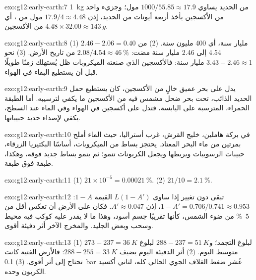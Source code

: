 \begin{solution}{exo:g12:early-earth:7}
\qty{1}{kg} من الحديد يساوي $1000/55.85 \approx 17.9$ مول؛ وجزيء واحد من
الأكسجين يأخذ أربعة أيونات من الحديد، إذن $17.9/4 \approx 4.48$ مول من
، أي $4.48 \times 32.00 \approx \qty{143}{g}$ من الأكسجين.
\end{solution}

\begin{solution}{exo:g12:early-earth:8}
(1) $2.46 - 2.06 = 0.40$ مليار سنة، أي 400 مليون سنة. (2) من 4.54
إلى 2.46 مليار سنة مضت: $2.08/4.54 \approx \qty{46}{\percent}$ من
تاريخ الأرض. (3) نحو $3.43 - 2.46 \approx 1$ مليار سنة: فالأكسجين
الذي صنعته الميكروبات ظل يُستهلك زمنًا طويلًا قبل أن يستطيع البقاء في
الهواء.
\end{solution}

\begin{solution}{exo:g12:early-earth:9}
 يدل على بحر عميق خالٍ من الأكسجين، كان يستطيع حمل
الحديد الذائب، تحت بحر ضحل مشمس فيه من الأكسجين ما يكفي لترسيبه.
أما الطبقة الحمراء، المترسبة على اليابسة، فتدل على أكسجين في الهواء وفي الماء
عند السطح، يكفي لإصداء حديد حبيباتها.
\end{solution}

\begin{solution}{exo:g12:early-earth:10}
في بركة هاملين، خليج القرش، غرب أستراليا، حيث الماء أملح بمرتين
من ماء البحر المعتاد. يحتجز بساط من الميكروبات، أساسًا البكتيريا الزرقاء،
حبيبات الرسوبيات ويربطها ويجعل الكربونات تنمو؛ ثم ينمو بساط جديد فوقه،
وهكذا، طبقة فوق طبقة.
\end{solution}

\begin{solution}{exo:g12:early-earth:11}
(1) $21 \times 10^{-5} = \qty{0.00021}{\percent}$. (2) $21/10 =
\qty{2.1}{\percent}$.
\end{solution}

\begin{solution}{exo:g12:early-earth:12}
تبقى  دون تغيير إذا ساوى $L(1 - A')$ القيمة $1 - A$:
$1 - A' = 0.706/0.741 \approx 0.953$، إذن $A' \approx 0.047$. فكان على الأرض
أن تعكس أقل من \qty{5}{\percent} من ضوء الشمس، كأنها تقريبًا
جسم أسود، وهذا ما لا يقدر عليه كوكب فيه محيط وسحب وبعض الجليد.
والمخرج الآخر أثر دفيئة أقوى.
\end{solution}

\begin{solution}{exo:g12:early-earth:13}
(1) $273 - 237 = \qty{36}{K}$ لبلوغ التجمد؛ و$288 - 237 = \qty{51}{K}$
لبلوغ متوسط اليوم. (2) أثر الدفيئة اليوم يضيف $288 - 255 =
\qty{33}{K}$: فالأرض الفتية كانت تحتاج إلى أثر أقوى. (3) \qty{0.1}{bar}
عُشر ضغط الغلاف الجوي الحالي كله، لثاني أكسيد الكربون وحده.
\end{solution}

